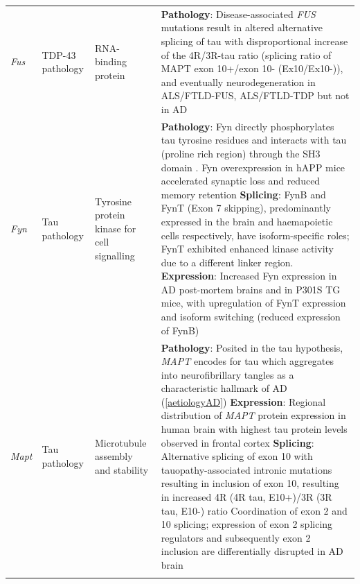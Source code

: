 \begin{changemargin}{1.5cm}
\begin{landscape}
\begin{longtable}[c]{p{1cm}p{2cm}p{4cm}p{19cm}}
			\centering \textit{Fus} &
			\centering TDP-43 pathology  &
			\centering RNA-binding protein  &			
			\tabitem \textbf{Pathology}: Disease-associated \textit{FUS} mutations result in altered alternative splicing of tau with disproportional increase of the 4R/3R-tau ratio (splicing ratio of MAPT exon 10+/exon 10- (Ex10/Ex10-)), and eventually neurodegeneration in ALS/FTLD-FUS, ALS/FTLD-TDP but not in AD\cite{Ishigaki2020} \\
			\hdashline[0.5pt/5pt]
			
			\centering \textit{Fyn} &
			\centering Tau pathology  &
			\centering Tyrosine protein kinase for cell signalling &			
			\tabitem \textbf{Pathology}: Fyn directly phosphorylates tau tyrosine residues and  interacts with tau (proline rich region) through the SH3 domain \cite{Bhaskar2010}. \newline 
			\tabitem Fyn overexpression in hAPP mice accelerated synaptic loss and reduced memory retention\cite{Chin2005} \newline
			\tabitem \textbf{Splicing}: FynB and FynT (Exon 7 skipping), predominantly expressed in the brain and haemapoietic cells respectively, have isoform-specific roles; FynT exhibited enhanced kinase activity due to a different linker region. \newline
			\tabitem \textbf{Expression}: Increased Fyn expression in AD post-mortem brains\cite{Lee2016b} and in P301S TG mice\cite{Low2021}, with upregulation of FynT expression and isoform switching (reduced expression of FynB)\cite{Lee2016b} \\
			\hdashline[0.5pt/5pt]
			
			\centering \textit{Mapt} &
			\centering Tau pathology  &
			\centering Microtubule assembly and stability  &			
			\tabitem  \textbf{Pathology}: Posited in the tau hypothesis, \textit{MAPT} encodes for tau which aggregates into neurofibrillary tangles as a characteristic hallmark of AD (\cref{aetiologyAD}) \newline 
			\tabitem \textbf{Expression}: Regional distribution of \textit{MAPT} protein expression in human brain with highest tau protein levels observed in frontal cortex \cite{Trabzuni2012} \newline
			\tabitem \textbf{Splicing}: Alternative splicing of exon 10 with tauopathy-associated intronic mutations resulting in inclusion of exon 10, resulting in increased 4R (4R tau, E10+)/3R (3R tau, E10-) ratio\cite{Bowles2022} \newline
			\tabitem Coordination of exon 2 and 10 splicing; expression of exon 2 splicing regulators and subsequently exon 2 inclusion are differentially disrupted in AD brain \cite{Bowles2022} \\
			\hdashline[0.5pt/5pt]
			

\end{longtable}
\end{landscape}
\end{changemargin}
